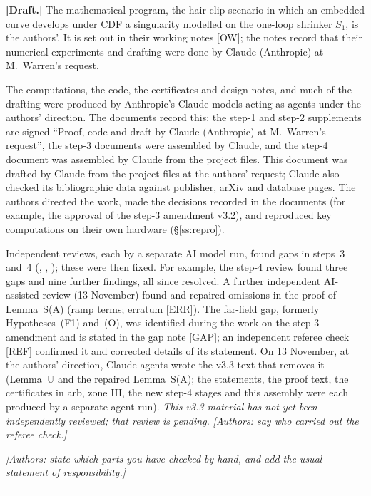 \documentclass[11pt]{amsart}
\theoremstyle{definition}
\theoremstyle{remark}
\newcommand{\fn}[1]{\texttt{\detokenize{#1}}}
\newcommand{\dref}[1]{[\textsf{#1}]}
\begin{document}
{\small\textbf{[Draft.]} The mathematical program, the hair-clip scenario in which an embedded curve develops under CDF a singularity modelled on the one-loop shrinker $S_1$, is the authors'. It is set out in their working notes \dref{OW}; the notes record that their numerical experiments and drafting were done by Claude (Anthropic) at M.~Warren's request.

The computations, the code, the certificates and design notes, and much of the drafting were produced by Anthropic's Claude models acting as agents under the authors' direction. The documents record this: the step-1 and step-2 supplements are signed ``Proof, code and draft by Claude (Anthropic) at M.~Warren's request'', the step-3 documents were assembled by Claude, and the step-4 document was assembled by Claude from the project files. This document was drafted by Claude from the project files at the authors' request; Claude also checked its bibliographic data against publisher, arXiv and database pages. The authors directed the work, made the decisions recorded in the documents (for example, the approval of the step-3 amendment v3.2), and reproduced key computations on their own hardware (\S\ref{ss:repro}).

Independent reviews, each by a separate AI model run, found gaps in steps~3 and~4 (\fn{STEP3_REVIEW.md}, \fn{STEP3_REVIEW2.md}, \fn{STEP4_REVIEW.md}); these were then fixed. For example, the step-4 review found three gaps and nine further findings, all since resolved. A further independent AI-assisted review (13 November) found and repaired omissions in the proof of Lemma~S(A) (ramp terms; erratum \dref{ERR}). The far-field gap, formerly Hypotheses~(F1) and~(O), was identified during the work on the step-3 amendment and is stated in the gap note \dref{GAP}; an independent referee check \dref{REF} confirmed it and corrected details of its statement. On 13 November, at the authors' direction, Claude agents wrote the v3.3 text that removes it (Lemma~U and the repaired Lemma~S(A); the statements, the proof text, the certificates in arb, zone III, the new step-4 stages and this assembly were each produced by a separate agent run). \emph{This v3.3 material has not yet been independently reviewed; that review is pending.} \emph{[Authors: say who carried out the referee check.]}

\emph{[Authors: state which parts you have checked by hand, and add the usual statement of responsibility.]}\par}
\noindent\rule{\linewidth}{0.4pt}
\end{document}
